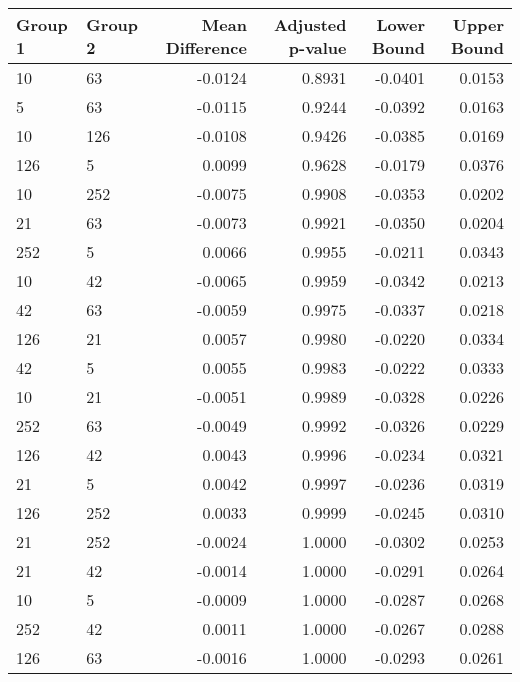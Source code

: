 \begin{tabular}{llrrrr}
\toprule
Group 1 & Group 2 & Mean Difference & Adjusted p-value & Lower Bound & Upper Bound \\
\midrule
10 & 63 & -0.0124 & 0.8931 & -0.0401 & 0.0153 \\
5 & 63 & -0.0115 & 0.9244 & -0.0392 & 0.0163 \\
10 & 126 & -0.0108 & 0.9426 & -0.0385 & 0.0169 \\
126 & 5 & 0.0099 & 0.9628 & -0.0179 & 0.0376 \\
10 & 252 & -0.0075 & 0.9908 & -0.0353 & 0.0202 \\
21 & 63 & -0.0073 & 0.9921 & -0.0350 & 0.0204 \\
252 & 5 & 0.0066 & 0.9955 & -0.0211 & 0.0343 \\
10 & 42 & -0.0065 & 0.9959 & -0.0342 & 0.0213 \\
42 & 63 & -0.0059 & 0.9975 & -0.0337 & 0.0218 \\
126 & 21 & 0.0057 & 0.9980 & -0.0220 & 0.0334 \\
42 & 5 & 0.0055 & 0.9983 & -0.0222 & 0.0333 \\
10 & 21 & -0.0051 & 0.9989 & -0.0328 & 0.0226 \\
252 & 63 & -0.0049 & 0.9992 & -0.0326 & 0.0229 \\
126 & 42 & 0.0043 & 0.9996 & -0.0234 & 0.0321 \\
21 & 5 & 0.0042 & 0.9997 & -0.0236 & 0.0319 \\
126 & 252 & 0.0033 & 0.9999 & -0.0245 & 0.0310 \\
21 & 252 & -0.0024 & 1.0000 & -0.0302 & 0.0253 \\
21 & 42 & -0.0014 & 1.0000 & -0.0291 & 0.0264 \\
10 & 5 & -0.0009 & 1.0000 & -0.0287 & 0.0268 \\
252 & 42 & 0.0011 & 1.0000 & -0.0267 & 0.0288 \\
126 & 63 & -0.0016 & 1.0000 & -0.0293 & 0.0261 \\
\bottomrule
\end{tabular}
